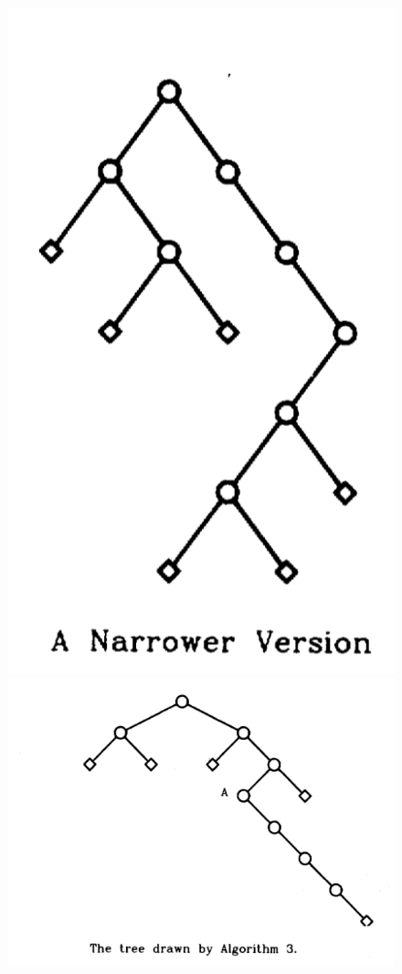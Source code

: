 \documentclass{article}
\begin{document}
    \vfill
    \begin{figure}[h]
        \begin{center}
      		\begin{left}
      			\includegraphics[scale=0.4]{arbreBinaireNarrow.png}
      		\end{left}
          \begin{right}
            \includegraphics[scale=0.4]{arbre3.png}

\end{right}
\end{center}
\end{figure}
\end{document}
